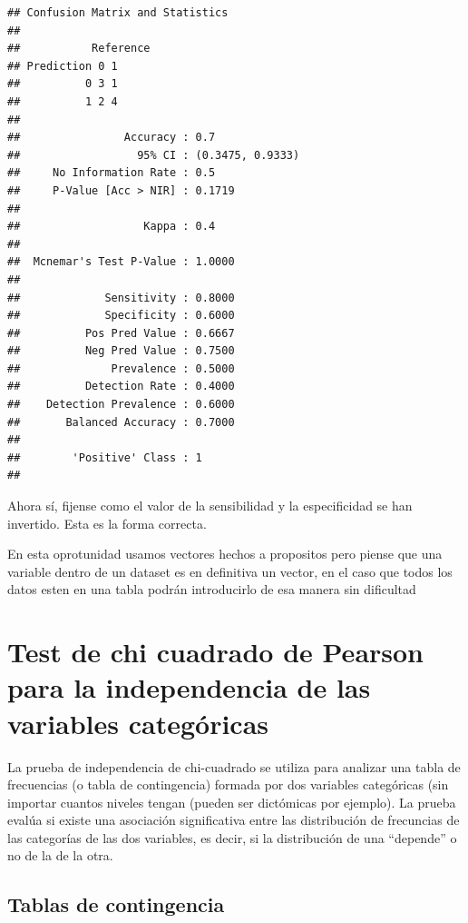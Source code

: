 \documentclass[
]{book}
\begin{document}
\begin{verbatim}
## Confusion Matrix and Statistics
## 
##           Reference
## Prediction 0 1
##          0 3 1
##          1 2 4
##                                           
##                Accuracy : 0.7             
##                  95% CI : (0.3475, 0.9333)
##     No Information Rate : 0.5             
##     P-Value [Acc > NIR] : 0.1719          
##                                           
##                   Kappa : 0.4             
##                                           
##  Mcnemar's Test P-Value : 1.0000          
##                                           
##             Sensitivity : 0.8000          
##             Specificity : 0.6000          
##          Pos Pred Value : 0.6667          
##          Neg Pred Value : 0.7500          
##              Prevalence : 0.5000          
##          Detection Rate : 0.4000          
##    Detection Prevalence : 0.6000          
##       Balanced Accuracy : 0.7000          
##                                           
##        'Positive' Class : 1               
## 
\end{verbatim}

Ahora sí, fijense como el valor de la sensibilidad y la especificidad se han invertido. Esta es la forma correcta.

En esta oprotunidad usamos vectores hechos a propositos pero piense que una variable dentro de un dataset es en definitiva un vector, en el caso que todos los datos esten en una tabla podrán introducirlo de esa manera sin dificultad

\hypertarget{test-de-chi-cuadrado-de-pearson-para-la-independencia-de-las-variables-categuxf3ricas}{%
\chapter{Test de chi cuadrado de Pearson para la independencia de las variables categóricas}\label{test-de-chi-cuadrado-de-pearson-para-la-independencia-de-las-variables-categuxf3ricas}}

La prueba de independencia de chi-cuadrado se utiliza para analizar una tabla de frecuencias (o tabla de contingencia) formada por dos variables categóricas (sin importar cuantos niveles tengan (pueden ser dictómicas por ejemplo). La prueba evalúa si existe una asociación significativa entre las distribución de frecuncias de las categorías de las dos variables, es decir, si la distribución de una ``depende'' o no de la de la otra.

\hypertarget{tablas-de-contingencia}{%
\section{Tablas de contingencia}\label{tablas-de-contingencia}}
\end{document}
